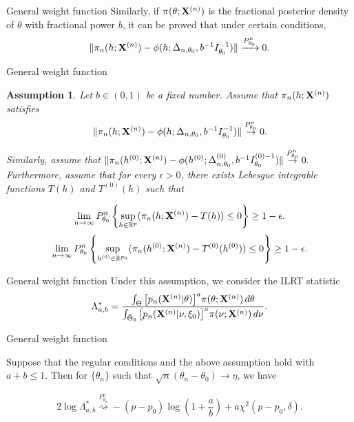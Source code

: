 \documentclass{beamer}
\theoremstyle{plain}
\newtheorem{assumption}{ Assumption}
\theoremstyle{definition}
\theoremstyle{remark}
\begin{document}
\begin{frame}{General weight function}
Similarly, if $\pi(\theta;\mathbf{X}^{(n)})$ is the fractional posterior density of $\theta$ with fractional power $b$, it can be proved that under certain conditions,
$$
\|\pi_n(h;\mathbf{X}^{(n)})-\phi(h;\Delta_{n,\theta_0},b^{-1} I_{\theta_0}^{-1})\|
            \xrightarrow{P_{\theta_0}^n}0.
$$

\end{frame}
\begin{frame}{General weight function}
\begin{assumption}\label{Assumption3}
    Let $b\in(0,1)$ be a fixed number.
    Assume that $\pi_n(h;\mathbf{X}^{(n)})$ satisfies
        \begin{equation}\label{vonMisesResults}
            \|\pi_n(h;\mathbf{X}^{(n)})-\phi(h;\Delta_{n,\theta_0},b^{-1}I_{\theta_0}^{-1})\|\overset{P_{\theta_0}^n}{\to}0.
        \end{equation}

        Similarly,  assume that 
        $
    \|\pi_n(h^{(0)};\mathbf{X}^{(n)})-\phi(h^{(0)};\Delta^{(0)}_{n,\theta_0},b^{-1}I_{\theta_0}^{(0)-1})\|\overset{P_{\theta_0}^n}{\to}0.
    $
Furthermore, assume that for every $\epsilon>0$, there exists Lebesgue integrable functions $T(h)$ and $T^{(0)}(h)$ such that 

    \begin{equation}\label{Assump31}
        \lim_{n\to \infty}P_{\theta_0}^n\left\{\sup_{h\in \mathbb{R}^p}(\pi_n(h;\mathbf{X}^{(n)})-T(h))\leq 0\right\}\geq 1-\epsilon.
\end{equation}
    \begin{equation}\label{Assump31l}
        \lim_{n\to \infty}P_{\theta_0}^n\left\{\sup_{h^{(0)}\in \mathbb{R}^{p_0}}(\pi_n(h^{(0)};\mathbf{X}^{(n)})-T^{(0)}(h^{(0)}))\leq 0\right\}\geq 1-\epsilon.
\end{equation}
\end{assumption}
\end{frame}
\begin{frame}{General weight function}
Under this assumption, we consider the ILRT statistic
\begin{equation*}
    \Lambda^*_{a,b}=\frac{\int_{\Theta} \big[p_n(\mathbf{X}^{(n)}|\theta)\big]^{a}\pi(\theta;\mathbf{X}^{(n)})\,d\theta}{\int_{\tilde{\Theta}_0} \big[p_n(\mathbf{X}^{(n)}|\nu,\xi_0)\big]^{a}\pi(\nu;\mathbf{X}^{(n)})\,d\nu}.
\label{eq:definition}
\end{equation*}
\end{frame}
\begin{frame}{General weight function}
\begin{theorem}\label{theoremMain}
    Suppose that the regular conditions and the above assumption hold with $a+b\leq 1$.
    Then for $\{\theta_n\}$ such that $\sqrt{n}(\theta_n-\theta_0)\to \eta$, we have

        $$
        2\log \Lambda^*_{a,b}\overset{P^n_{\theta_n}}{\rightsquigarrow}-{(p-p_0)}\log (1+\frac{a}{b})+{a}\chi^2(p-p_0,\delta).
        $$
\end{theorem}
\end{frame}
\end{document}
